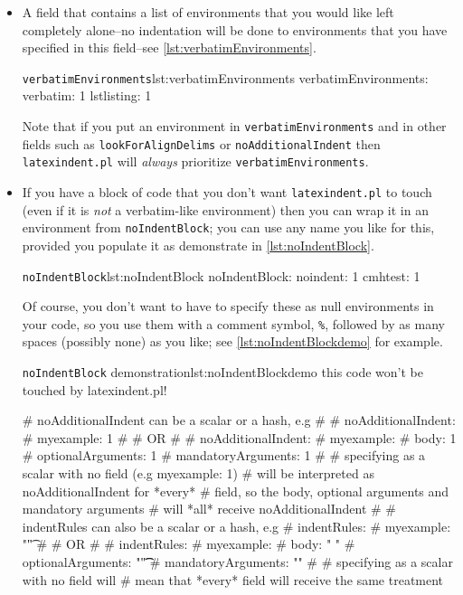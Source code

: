 \documentclass[11pt]{article}
\newcommand{\verbitem}[1]{\small\PVerb{#1}}
\begin{document}
\begin{itemize}
	\item[\verbitem{verbatimEnvironments}] A field that contains a list of environments
	      that you would like left completely alone--no indentation will be done
	      to environments that you have specified in this field--see \cref{lst:verbatimEnvironments}.


	      \begin{cmhlistings}[style=yaml]{\lstinline!verbatimEnvironments!}{lst:verbatimEnvironments}
verbatimEnvironments:
    verbatim: 1
    lstlisting: 1
	\end{cmhlistings}
	Note that if  you put an environment in \lstinline!verbatimEnvironments!
	and in other fields such as \lstinline!lookForAlignDelims! or \lstinline!noAdditionalIndent!
	then \lstinline!latexindent.pl! will \emph{always} prioritize \lstinline!verbatimEnvironments!.

	\item[\verbitem{noIndentBlock}] If you have a block of code that you don't
	      want \lstinline!latexindent.pl! to touch (even if it is \emph{not} a verbatim-like
	      environment) then you can wrap it in an environment from \lstinline!noIndentBlock!;
	      you can use any name you like for this, provided you populate it as demonstrate in
	      \cref{lst:noIndentBlock}.

	      \begin{cmhlistings}[style=yaml]{\lstinline!noIndentBlock!}{lst:noIndentBlock}
noIndentBlock:
    noindent: 1
    cmhtest: 1
	\end{cmhlistings}

	Of course, you don't want to have to specify these as null environments
	in your code, so you use them with a comment symbol, \lstinline!%!, followed
	by as many spaces (possibly none) as you like; see \cref{lst:noIndentBlockdemo} for
	example.
	\begin{cmhlistings}[style=demo,escapeinside={(*@}{@*)}]{\lstinline!noIndentBlock! demonstration}{lst:noIndentBlockdemo}
        this code
                won't
     be touched
                    by
             latexindent.pl!
	\end{cmhlistings}

    # noAdditionalIndent can be a scalar or a hash, e.g
    #
    #   noAdditionalIndent:
    #       myexample: 1
    #
    # OR
    #
    #   noAdditionalIndent:
    #       myexample: 
    #           body: 1
    #           optionalArguments: 1
    #           mandatoryArguments: 1
    # 
    # specifying as a scalar with no field (e.g myexample: 1)
    # will be interpreted as noAdditionalIndent for *every*
    # field, so the body, optional arguments and mandatory arguments
    # will *all* receive noAdditionalIndent 
    #
    # indentRules can also be a scalar or a hash, e.g
    #   indentRules:
    #       myexample: "\t"
    #
    # OR
    #
    #   indentRules:
    #       myexample:
    #           body: "  "
    #           optionalArguments: "\t \t"
    #           mandatoryArguments: ""
    #
    # specifying as a scalar with no field will
    # mean that *every* field will receive the same treatment


\end{itemize}
\end{document}
